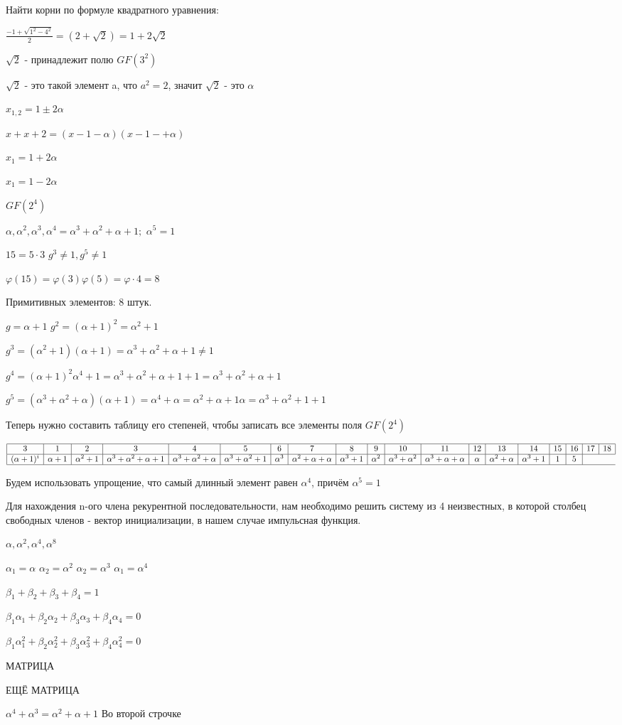 \documentclass{article}
\begin{document}
Найти корни по формуле квадратного уравнения:

$\frac{-1+\sqrt{1^2-4^2}}{2}=(2+\sqrt{2})=1+2\sqrt{2}$

$\sqrt{2}$ - принадлежит полю $GF(3^2)$

$\sqrt{2}$ - это такой элемент a, что $a^2=2$, значит $\sqrt{2}$ - это $\alpha$

$x_{1,2}=1\pm 2\alpha$

$x+x+2=(x-1-\alpha)(x-1-+\alpha)$

$x_1=1+2\alpha$

$x_1=1-2\alpha$

$GF(2^4)$

$\alpha,\alpha^2, \alpha^3, \alpha^4=\alpha^3+\alpha^2+\alpha+1;$ $\alpha^5=1$

$15=5\cdot 3$ $g^3\ne1, g^5\ne 1$

$\varphi(15)=\varphi(3)\varphi(5)=\varphi\cdot 4=8$

Примитивных элементов: 8 штук.

$g=\alpha+1$ $g^2=(\alpha+1)^2=\alpha^2+1$

$g^3=(\alpha^2+1)(\alpha+1)=\alpha^3+\alpha^2+\alpha+1\ne 1$

$g^4=(\alpha+1)^2\alpha^4+1=\alpha^3+\alpha^2+\alpha+1+1=\alpha^3+\alpha^2+\alpha+1$

$g^5=(\alpha^3+\alpha^2+\alpha)(\alpha+1)=\alpha^4+\alpha=\alpha^2+\alpha+1\alpha=\alpha^3+\alpha^2+1+1$

Теперь нужно составить таблицу его степеней, чтобы записать все элементы поля $GF(2^4)$

$$\begin{array}{|c|c|c|c|c|c|c|c|c|c|c|c|c|c|c|c|c|c|c|}
   \hline
   3 & 1 & 2 & 3 & 4 & 5 & 6 & 7 & 8 & 9 & 10 & 11 & 12 & 13 & 14 & 15 & 16 & 17 & 18 \\
   \hline
   (\alpha+1)^i & \alpha+1 & \alpha^2+1 & \alpha^3+\alpha^2+\alpha+1 & \alpha^3+\alpha^2+\alpha & \alpha^3+\alpha^2+1 & \alpha^3 & \alpha^2+\alpha+\alpha & \alpha^3+1 & \alpha^2 & \alpha^3+\alpha^2 & \alpha^3+\alpha+\alpha & \alpha & \alpha^2+\alpha & \alpha^3+1 & 1 & 5 \\
   \hline
\end{array}$$

Будем использовать упрощение, что самый длинный элемент равен $\alpha^4$, причём $\alpha^5=1$

Для  нахождения n-ого члена рекурентной последовательности, нам необходимо решить систему из 4 неизвестных, в которой столбец свободных членов - вектор инициализации, в нашем случае импульсная функция.

$\alpha, \alpha^2, \alpha^4, \alpha^8$

$\alpha_1=\alpha$ $\alpha_2=\alpha^2$ $\alpha_2=\alpha^3$ $\alpha_1=\alpha^4$

$\beta_1+\beta_2+\beta_3+\beta_4=1$

$\beta_1\alpha_1+\beta_2\alpha_2+\beta_3\alpha_3+\beta_4\alpha_4=0$

$\beta_1\alpha^2_1+\beta_2\alpha^2_2+\beta_3\alpha^2_3+\beta_4\alpha^2_4=0$

МАТРИЦА

ЕЩЁ МАТРИЦА

$\alpha^4+\alpha^3=\alpha^2+\alpha+1$ Во второй строчке
\end{document}
